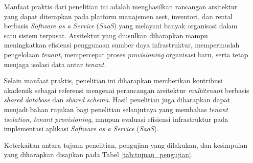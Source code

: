 Manfaat praktis dari penelitian ini adalah menghasilkan rancangan arsitektur yang dapat diterapkan pada platform manajemen aset, inventori, dan rental berbasis \textit{Software as a Service} (\textit{SaaS}) yang melayani banyak organisasi dalam satu sistem terpusat. Arsitektur yang diusulkan diharapkan mampu meningkatkan efisiensi penggunaan sumber daya infrastruktur, mempermudah pengelolaan \textit{tenant}, mempercepat proses \textit{provisioning} organisasi baru, serta tetap menjaga isolasi data antar \textit{tenant}.

Selain manfaat praktis, penelitian ini diharapkan memberikan kontribusi akademik sebagai referensi mengenai perancangan arsitektur \textit{multitenant} berbasis \textit{shared database} dan \textit{shared schema}. Hasil penelitian juga diharapkan dapat menjadi bahan rujukan bagi penelitian selanjutnya yang membahas \textit{tenant isolation}, \textit{tenant provisioning}, maupun evaluasi efisiensi infrastruktur pada implementasi aplikasi \textit{Software as a Service} (\textit{SaaS}).

Keterkaitan antara tujuan penelitian, pengujian yang dilakukan, dan kesimpulan yang diharapkan disajikan pada Tabel \ref{tab:tujuan_pengujian}.

